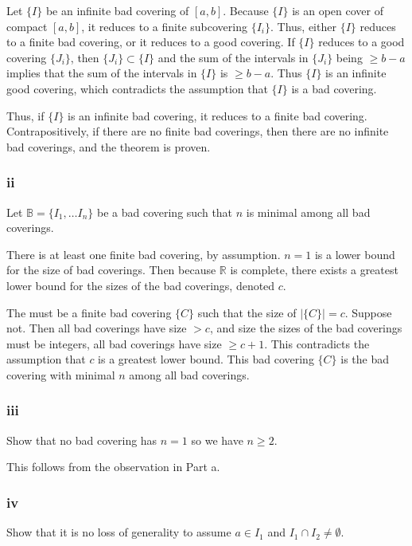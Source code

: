 \documentclass{article}
\newcommand{\R}{\mathbb{R}}
\newcommand{\B}{\mathbb{B}}
\begin{document}
Let $\{I\}$ be an infinite bad covering of $[a, b]$. Because $\{I\}$ is an open cover of compact $[a, b]$, it reduces to a finite subcovering $\{I_i\}$. Thus, either $\{I\}$ reduces to a finite bad covering, or it reduces to a good covering. If $\{I\}$ reduces to a good covering $\{J_i\}$, then  $\{J_i\} \subset \{I\}$ and the sum of the intervals in $\{J_i\}$ being $\geq b-a$ implies that the sum of the intervals in $\{I\}$ is $\geq b-a$. Thus $\{I\}$ is an infinite good covering, which contradicts the assumption that $\{I\}$ is a bad covering.

Thus, if $\{I\}$ is an infinite bad covering, it reduces to a finite bad covering. Contrapositively, if there are no finite bad coverings, then there are no infinite bad coverings, and the theorem is proven.

\subsubsection*{ii}

Let $\B = \{I_1, \dots I_n\}$ be a bad covering such that $n$ is minimal among all bad coverings.

There is at least one finite bad covering, by assumption. $n=1$ is a lower bound for the size of bad coverings. Then because $\R$ is complete, there exists a greatest lower bound for the sizes of the bad coverings, denoted $c$.

The must be a finite bad covering $\{C\}$ such that the size of $|\{C\}| = c$. Suppose not. Then all bad coverings have size $> c$, and size the sizes of the bad coverings must be integers, all bad coverings have size $\geq c+1$. This contradicts the assumption that $c$ is a greatest lower bound. This bad covering $\{C\}$ is the bad covering with minimal $n$ among all bad coverings.

\subsubsection*{iii}

Show that no bad covering has $n=1$ so we have $n \geq 2$.

This follows from the observation in Part a.

\subsubsection*{iv}

Show that it is no loss of generality to assume $a \in I_1$ and $I_1 \cap I_2 \neq \emptyset$.
\end{document}
